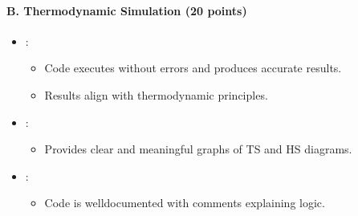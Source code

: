 \documentclass[letterpaper,10pt,english]{jupyterBook}
\begin{document}
\paragraph{B. Thermodynamic Simulation (20 points)}
\label{\detokenize{ProjectInstructions:b-thermodynamic-simulation-20-points}}\begin{itemize}
\item {} 
\sphinxAtStartPar
{}:
\begin{itemize}
\item {} 
\sphinxAtStartPar
Code executes without errors and produces accurate results.

\item {} 
\sphinxAtStartPar
Results align with thermodynamic principles.

\end{itemize}

\item {} 
\sphinxAtStartPar
{}:
\begin{itemize}
\item {} 
\sphinxAtStartPar
Provides clear and meaningful graphs of T\sphinxhyphen{}S and H\sphinxhyphen{}S diagrams.

\end{itemize}

\item {} 
\sphinxAtStartPar
{}:
\begin{itemize}
\item {} 
\sphinxAtStartPar
Code is well\sphinxhyphen{}documented with comments explaining logic.

\end{itemize}

\end{itemize}
\end{document}
